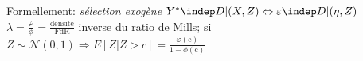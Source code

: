 \bigbreak
\noindent Formellement: \textit{sélection exogène} \quad $Y^{*} \indep D\vert(X,Z) \Leftrightarrow \varepsilon \indep D\vert(\eta,Z)$\\
$ \lambda = \frac{\varphi}{\phi} = \frac{\textrm{densité}}{\textrm{FdR}}$ inverse du ratio de Mills; si $ Z\sim \mathcal{N}(0,1) \Rightarrow E[Z\vert Z>c]=\frac{\varphi(\text{c})}{1- \phi(\text{c})}$

